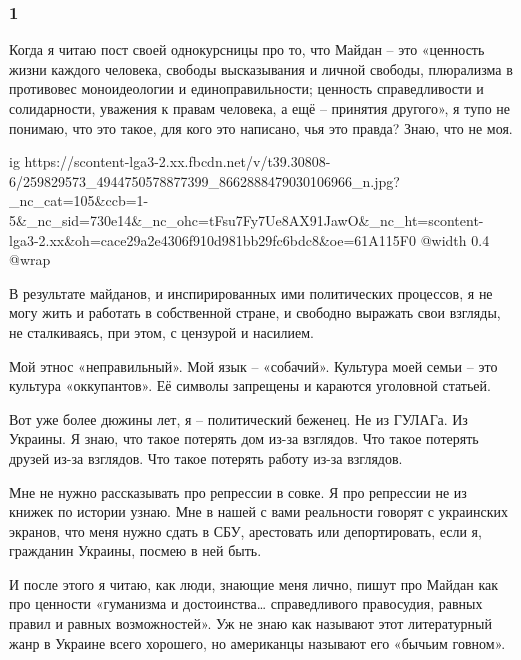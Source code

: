  
 
 
 
 

\subsubsection{1}

Когда я читаю пост своей однокурсницы про то, что Майдан – это «ценность жизни
каждого человека, свободы высказывания и личной свободы, плюрализма в
противовес моноидеологии и единоправильности; ценность справедливости и
солидарности, уважения к правам человека, а ещё – принятия другого», я тупо не
понимаю, что это такое, для кого это написано, чья это правда? Знаю, что не
моя.

\ifcmt
  ig https://scontent-lga3-2.xx.fbcdn.net/v/t39.30808-6/259829573_4944750578877399_8662888479030106966_n.jpg?_nc_cat=105&ccb=1-5&_nc_sid=730e14&_nc_ohc=tFsu7Fy7Ue8AX91JawO&_nc_ht=scontent-lga3-2.xx&oh=cace29a2e4306f910d981bb29fc6bdc8&oe=61A115F0
  @width 0.4
  @wrap 
\fi

В результате майданов, и инспирированных ими политических процессов, я не могу
жить и работать в собственной стране, и свободно выражать свои взгляды, не
сталкиваясь, при этом, с цензурой и насилием.

Мой этнос «неправильный». Мой язык – «собачий». Культура моей семьи – это
культура «оккупантов». Её символы запрещены и караются уголовной статьей.

Вот уже более дюжины лет, я – политический беженец. Не из ГУЛАГа. Из Украины. Я
знаю, что такое потерять дом из-за взглядов. Что такое потерять друзей из-за
взглядов. Что такое потерять работу из-за взглядов. 

Мне не нужно рассказывать про репрессии в совке. Я про репрессии не из книжек
по истории узнаю. Мне в нашей с вами реальности говорят с украинских экранов,
что меня нужно сдать в СБУ, арестовать или депортировать, если я, гражданин
Украины, посмею в ней быть. 

И после этого я читаю, как люди, знающие меня лично, пишут про Майдан как про
ценности «гуманизма и достоинства… справедливого правосудия, равных правил и
равных возможностей». Уж не знаю как называют этот литературный жанр в Украине
всего хорошего, но американцы называют его «бычьим говном».  


